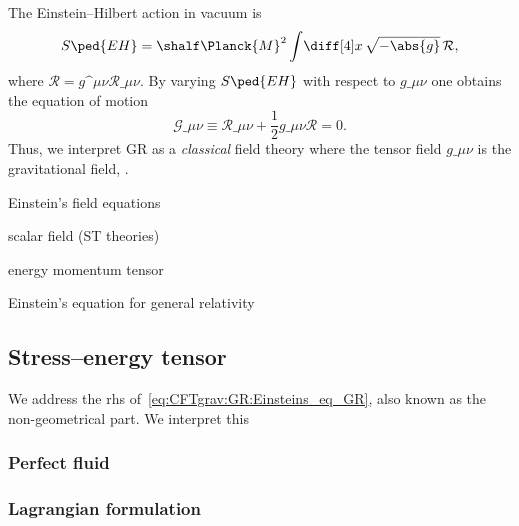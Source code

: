 


The Einstein--Hilbert action in vacuum is 
\begin{equation}
    S\ped{EH} = \shalf \Planck{M}^2 \int \! \diff[4]x \,\sqrt{-\abs{g}}\,  \mathcal{R}, 
\end{equation}
where $\mathcal{R} = g\^{\mu\nu}\mathcal{R}\_{\mu\nu}$. By varying $S\ped{EH}$ with respect to $g\_{\mu\nu}$ one obtains the equation of motion
\begin{equation}
    \mathcal{G}\_{\mu\nu} \equiv \mathcal{R}\_{\mu\nu} + \frac{1}{2} g\_{\mu\nu} \mathcal{R} = 0.
\end{equation}
Thus, we interpret GR as a \emph{classical} field theory where the tensor field $g\_{\mu\nu}$ is the gravitational field, .



\begin{bullets}
    \item Einstein's field equations
    \item scalar field (ST theories) 
    \item energy momentum tensor
\end{bullets}








Einstein's equation for general relativity

\subsection{Stress--energy tensor}

    We address the rhs of~\cref{eq:CFTgrav:GR:Einsteins_eq_GR}, also known as the non-geometrical part. We interpret this 



    \subsubsection{Perfect fluid}

    \subsubsection{Lagrangian formulation}
        
    


  







